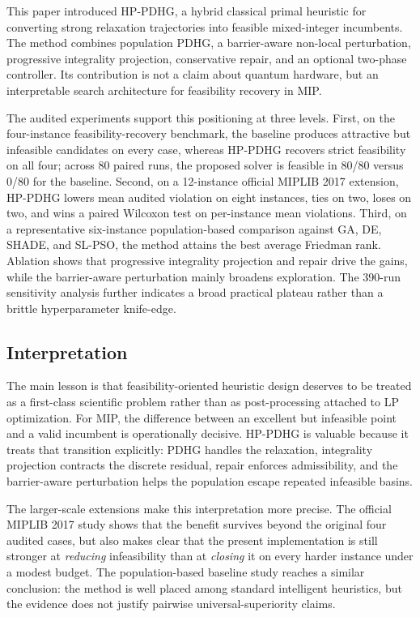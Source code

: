 This paper introduced HP-PDHG, a hybrid classical primal heuristic for converting strong relaxation trajectories into feasible mixed-integer incumbents. The method combines population PDHG, a barrier-aware non-local perturbation, progressive integrality projection, conservative repair, and an optional two-phase controller. Its contribution is not a claim about quantum hardware, but an interpretable search architecture for feasibility recovery in MIP.

The audited experiments support this positioning at three levels. First, on the four-instance feasibility-recovery benchmark, the baseline produces attractive but infeasible candidates on every case, whereas HP-PDHG recovers strict feasibility on all four; across 80 paired runs, the proposed solver is feasible in 80/80 versus 0/80 for the baseline. Second, on a 12-instance official MIPLIB 2017 extension, HP-PDHG lowers mean audited violation on eight instances, ties on two, loses on two, and wins a paired Wilcoxon test on per-instance mean violations. Third, on a representative six-instance population-based comparison against GA, DE, SHADE, and SL-PSO, the method attains the best average Friedman rank. Ablation shows that progressive integrality projection and repair drive the gains, while the barrier-aware perturbation mainly broadens exploration. The 390-run sensitivity analysis further indicates a broad practical plateau rather than a brittle hyperparameter knife-edge.

\subsection{Interpretation}
\label{subsec:future}

The main lesson is that feasibility-oriented heuristic design deserves to be treated as a first-class scientific problem rather than as post-processing attached to LP optimization. For MIP, the difference between an excellent but infeasible point and a valid incumbent is operationally decisive. HP-PDHG is valuable because it treats that transition explicitly: PDHG handles the relaxation, integrality projection contracts the discrete residual, repair enforces admissibility, and the barrier-aware perturbation helps the population escape repeated infeasible basins.

The larger-scale extensions make this interpretation more precise. The official MIPLIB 2017 study shows that the benefit survives beyond the original four audited cases, but also makes clear that the present implementation is still stronger at \emph{reducing} infeasibility than at \emph{closing} it on every harder instance under a modest budget. The population-based baseline study reaches a similar conclusion: the method is well placed among standard intelligent heuristics, but the evidence does not justify pairwise universal-superiority claims.

